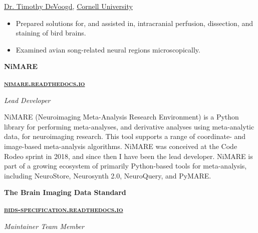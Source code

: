 \documentclass[10pt]{article}
\newcommand{\shorturl}[1]{\href{https://#1}{\textsc{#1}}}
\newcommand{\sectionstyle}{\LARGE \fontfamily{lmr}\selectfont}
\begin{document}
\href{http://www.psych.cornell.edu/people/faculty/devoogd-profile/}{Dr. Timothy DeVoogd},
\href{http://www.cornell.edu}{Cornell University}

\begin{itemize}[noitemsep, nolistsep]
\item
  Prepared solutions for, and assisted in, intracranial perfusion,
  dissection, and staining of bird brains.
\item
  Examined avian song-related neural regions microscopically.
\end{itemize}

\newpage

\begin{center}\sectionstyle{SOFTWARE AND PROJECT DEVELOPMENT}\end{center}

\begin{minipage}[t]{.5\linewidth}
	\flushleft
	\noindent
	\textbf{NiMARE}
\end{minipage}
\hfill
\begin{minipage}[t]{.5\linewidth}
	\flushright
	\noindent
	\textbf{\shorturl{nimare.readthedocs.io}}
\end{minipage}

\emph{Lead Developer}

\begin{adjustwidth}{2em}{0em}
	NiMARE (Neuroimaging Meta-Analysis Research Environment) is a Python library for performing meta-analyses,
	and derivative analyses using meta-analytic data, for neuroimaging research.
	This tool supports a range of coordinate- and image-based meta-analysis algorithms.
	NiMARE was conceived at the Code Rodeo sprint in 2018, and since then I have been the lead developer.
	NiMARE is part of a growing ecosystem of primarily Python-based tools for meta-analysis,
	including NeuroStore, Neurosynth 2.0, NeuroQuery, and PyMARE.
\end{adjustwidth}

\bigskip

\begin{minipage}[t]{.5\linewidth}
	\flushleft
	\noindent
	\textbf{The Brain Imaging Data Standard}
\end{minipage}
\hfill
\begin{minipage}[t]{.5\linewidth}
	\flushright
	\noindent
	\textbf{\shorturl{bids-specification.readthedocs.io}}
\end{minipage}

\emph{Maintainer Team Member}
\end{document}
